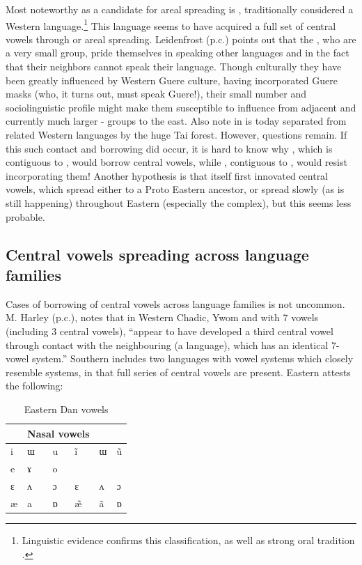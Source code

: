 \documentclass[output=paper,newtxmath,modfonts,nonflat,draft]{langsci/langscibook}
\begin{document}
Most noteworthy as a candidate for areal spreading is , traditionally considered a Western  language.\footnote{Linguistic evidence confirms this classification, as well as strong oral tradition \citep{centredetraduction2013}.} This language seems to have acquired a full set of central vowels through  or areal spreading.  Leidenfrost (p.c.) points out that the , who are a very small group, pride themselves in speaking other languages and in the fact that their neighbors cannot speak their language.  Though culturally they have been greatly influenced by Western Guere culture, having incorporated Guere masks (who, it turns out, must speak Guere!), their small number and sociolinguistic profile might make them susceptible to influence from adjacent and currently much larger -  groups to the east. Also note in   is today separated from related Western languages by the huge Tai forest. However, questions remain. If this such contact and borrowing did occur, it is hard to know why , which is contiguous to , would borrow central vowels, while , contiguous to , would resist incorporating them! Another hypothesis is that  itself first innovated central vowels, which spread either to a Proto Eastern  ancestor, or spread slowly (as is still happening) throughout Eastern  (especially the  complex), but this seems less probable.   

\subsection{Central vowels spreading across language families}\label{sec:zogbo:5.2} 

Cases of borrowing of central vowels across language families is not uncommon. M. Harley (p.c.), notes that in Western Chadic, Ywom and  with 7 vowels (including 3 central vowels), “appear to have developed a third central vowel through contact with the neighbouring  (a  language), which has an identical 7-vowel system.”  Southern  includes two  languages with vowel systems which closely resemble  systems, in that full series of central vowels are present. Eastern  attests the following: 

\begin{table}
\caption{Eastern Dan vowels \citep{Vydrine2009}}
\label{tab:zogbo:24}
\begin{tabular}{llp{2cm}lll}
\lstoprule
\multicolumn{3}{l}{Oral vowels} &     \multicolumn{3}{l}{Nasal vowels}\\
\midrule
i & ɯ & u  &  ĩ & ɯ & ũ\\

e & ɤ & o\\

ɛ & ʌ & ɔ  &  ɛ & ʌ & ɔ\\

æ & a & ɒ  &  \~{æ} & ã & ɒ
\lsbottomrule
\end{tabular}
\end{table}
\end{document}
